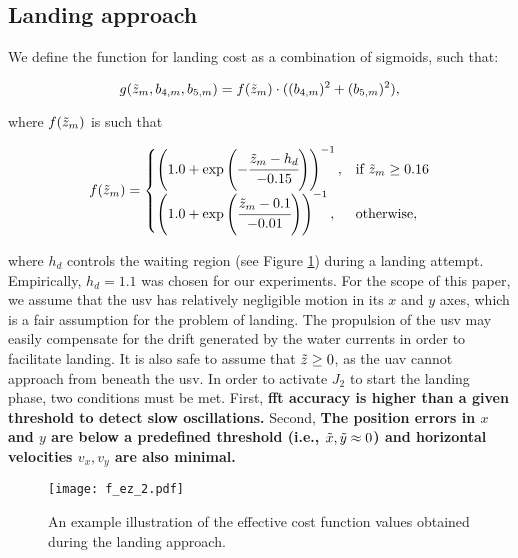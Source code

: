 \documentclass[letterpaper, 10 pt, journal, twoside]{IEEEtran}
\begin{document}
\subsection{Landing approach}

We define the function for landing cost as a combination of sigmoids, such that:
\begin{small}
\begin{equation}\label{eqn:J-2}
    g(\Tilde{z}_m, b_{4,m}, b_{5,m}) = f(\Tilde{z}_m)\cdot((b_{4,m})^2 + (b_{5,m})^2),
\end{equation}
\end{small}
\noindent where $f(\Tilde{z}_m)$ is such that

\begin{footnotesize}
\begin{equation}
    f(\Tilde{z}_m)= 
\begin{cases}
    \left(1.0 + \exp\left(-\cfrac{\Tilde{z}_m - h_d}{-0.15}\right)\right)^{-1} ,& \text{if } \Tilde{z}_m \geq 0.16\\ 
    \left(1.0 + \exp\left(\cfrac{\Tilde{z}_m - 0.1}{-0.01}\right)\right)^{-1}  ,& \text{otherwise},
\end{cases} 
\end{equation}
\end{footnotesize}
\noindent where $h_d$ controls the waiting region (see Figure \ref{fig:cost_function}) during a landing attempt. Empirically, $h_d = 1.1$ was chosen for our experiments. For the scope of this paper, we assume that the \ac{usv} has relatively negligible motion in its $x$ and $y$ axes, which is a fair assumption for the problem of landing. The propulsion of the \ac{usv} may easily compensate for the drift generated by the water currents in order to facilitate landing. It is also safe to assume that $\Tilde{z} \geq 0$, as the \ac{uav} cannot approach from beneath the \ac{usv}. In order to activate $J_2$ to start the landing phase, two conditions must be met. First, \textbf{\ac{fft} accuracy is higher than a given threshold to detect slow oscillations.} Second, \textbf{The position errors in $x$ and $y$ are below a predefined threshold (i.e., $\Tilde{x}, \Tilde{y} \approx 0$) and horizontal velocities $v_x, v_y$ are also minimal.}


\begin{figure}[!t]
    \centering
    \texttt{[image: f\_ez\_2.pdf]}
    \caption{An example illustration of the effective cost function values obtained during the landing approach.}
    \label{fig:cost_function}
\end{figure}
\end{document}
